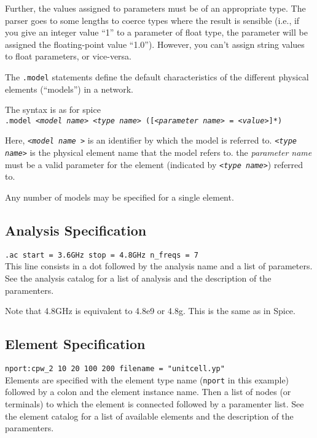 Further, the values assigned to parameters must be of an appropriate
type.  The parser goes to some lengths to coerce types where the
result is sensible (i.e., if you give an integer value ``1'' to a
parameter of float type, the parameter will be assigned the
floating-point value ``1.0'').  However, you can't assign string
values to float parameters, or vice-versa.

The {\tt .model} statements define the default characteristics of the
different physical elements (``models'') in a network.

The syntax is as for spice \medskip \\
{\tt .model  <{\it model name}> <{\it type name}> ([<{\it parameter name}> =
<{\it value}>]*) }

Here, {\tt <{\it model name }>} is an identifier by which the model is
referred to.  {\tt <{\it type name}>} is the physical element name
that the model refers to.  the {\it parameter name} must be a valid
parameter for the element (indicated by {\tt <{\it type name}>})
referred to.

Any number of models may be specified for a single element.

\subsection{Analysis Specification}

{\tt .ac start = 3.6GHz stop = 4.8GHz n\_freqs = 7} \medskip \\
This line consists in a dot followed by the analysis name and a list
of parameters. See the analysis catalog for a list of analysis and the
description of the paramenters.

Note that 4.8GHz is equivalent to 4.8e9 or 4.8g. This is the same as
in Spice.

\subsection{Element Specification}

{\tt nport:cpw\_2 10 20 100 200 filename = "unitcell.yp"} \medskip \\
Elements are specified with the element type name ({\tt nport} in this
example) followed by a colon and the element instance name. Then a
list of nodes (or terminals) to which the element is connected
followed by a paramenter list. See the element catalog for a list of
available elements and the description of the paramenters.

